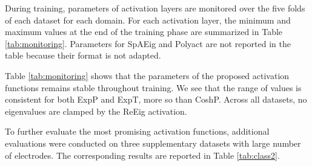 \documentclass[11pt,a4paper]{article}
\begin{document}
\noindent During training, parameters of activation layers are monitored over the five folds of each dataset for each domain. For each activation layer, the minimum and maximum values at the end of the training phase are summarized in Table \ref{tab:monitoring}. Parameters for SpAEig and Polyact are not reported in the table because their format is not adapted. 

\begin{table}[H]
\centering
\caption{Parameters monitoring during training on different datasets.}
\label{tab:monitoring}
\end{table}

\noindent Table \ref{tab:monitoring} shows that the parameters of the proposed activation functions remains stable throughout training. We see that the range of values is consistent for both ExpP and ExpT, more so than CoshP. Across all datasets, no eigenvalues are clamped by the ReEig activation.

\noindent To further evaluate the most promising activation functions, additional evaluations were conducted on three supplementary datasets with large number of electrodes. The corresponding results are reported in Table \ref{tab:class2}.
\end{document}
